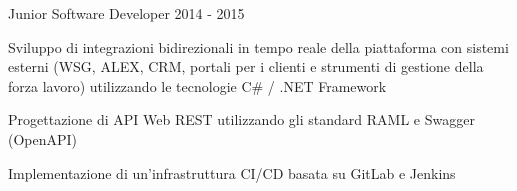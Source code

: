 \begin{cventries}
  \cventry
    {Junior Software Developer} %
    {} %
    {} %
    {} %
    {2014 - 2015} %
    {
      \begin{cvitems} %
        \item {Sviluppo di integrazioni bidirezionali in tempo reale della piattaforma con sistemi esterni (WSG, ALEX, CRM, portali per i clienti e strumenti di gestione della forza lavoro) utilizzando le tecnologie C\# / .NET Framework}
        \item {Progettazione di API Web REST utilizzando gli standard RAML e Swagger (OpenAPI)}
        \item {Implementazione di un'infrastruttura CI/CD basata su GitLab e Jenkins}
      \end{cvitems}
    }

\end{cventries}
